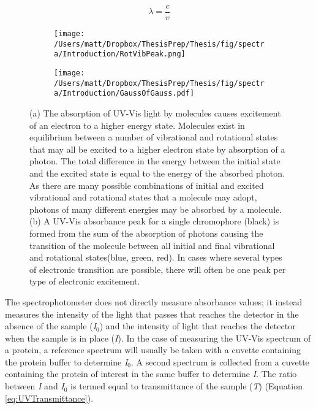 \begin{equation}\label{eq:FrequencytoWavelength}
\lambda = \frac{c}{v}
\end{equation}

\begin{figure}[!hbtp]
\centering
\begin{subfigure}{.5\textwidth}
  \centering
  \texttt{[image: /Users/matt/Dropbox/ThesisPrep/Thesis/fig/spectra/Introduction/RotVibPeak.png]}
  \caption{}
  \label{fig:UV_Peak}
\end{subfigure}%
\begin{subfigure}{.5\textwidth}
  \centering
  \texttt{[image: /Users/matt/Dropbox/ThesisPrep/Thesis/fig/spectra/Introduction/GaussOfGauss.pdf]}
  \caption{}
  \label{fig:GaussOfGauss}
\end{subfigure}
\caption[Composition of UV-Vis absorption peaks]{(a) The absorption of UV-Vis light by molecules causes excitement of an electron to a higher energy state. Molecules exist in equilibrium between a number of vibrational and rotational states that may all be excited to a higher electron state by absorption of a photon. The total difference in the energy between the initial state and the excited state is equal to the energy of the absorbed photon. As there are many possible combinations of initial and excited vibrational and rotational states that a molecule may adopt, photons of many different energies may be absorbed by a molecule. (b) A UV-Vis absorbance peak for a single chromophore (black) is formed from the sum of the absorption of photons causing the transition of the molecule between all initial and final vibrational and rotational states(blue, green, red). In cases where several types of electronic transition are possible, there will often be one peak per type of electronic excitement.}
\end{figure}  

The spectrophotometer does not directly measure absorbance values; it instead measures the intensity of the light that passes that reaches the detector in the absence of the sample (\textit{I$_0$}) and the intensity of light that reaches the detector when the sample is in place (\textit{I}). In the case of measuring the UV-Vis spectrum of a protein, a reference spectrum will usually be taken with a cuvette containing the protein buffer to determine \textit{I$_0$}. A second spectrum is collected from a cuvette containing the protein of interest in the same buffer to determine \textit{I}. The ratio between \textit{I} and \textit{I$_0$} is termed equal to transmittance of the sample (\textit{T}) (Equation \ref{eq:UVTransmittance}). 

